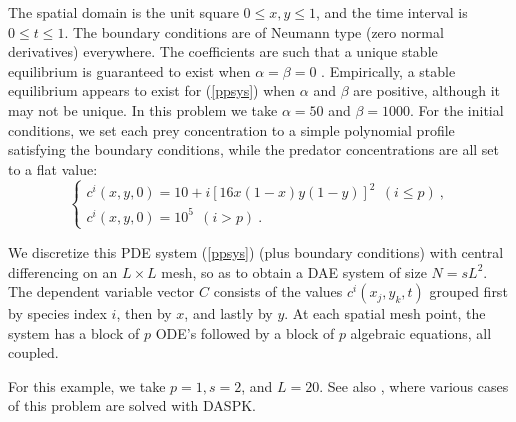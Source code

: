 \documentclass[11pt]{article}
\begin{document}
The spatial domain is the unit square $0 \leq x,y \leq 1$, and the
time interval is $0 \leq t \leq 1$.  The boundary conditions are of
Neumann type (zero normal derivatives) everywhere.  The coefficients
are such that a unique stable equilibrium is guaranteed to exist when
$\alpha = \beta = 0$ \cite{Br86}.  Empirically, a stable equilibrium
appears to exist for (\ref{ppsys}) when $\alpha$ and $\beta$ are
positive, although it may not be unique. In this problem we take
$\alpha = 50$ and $\beta = 1000$.  For the initial conditions, we set
each prey concentration to a simple polynomial profile satisfying the
boundary conditions, while the predator concentrations are all set to
a flat value:
\[
\left\{ \begin{array}{l}
c^i(x,y,0) = 10 + i [16x(1 - x)y(1 - y)]^2 ~~ (i \leq p) ~, \\
c^i(x,y,0) = 10^5 ~~ (i > p) ~.
\end{array} \right.
\]

We discretize this PDE system (\ref{ppsys}) (plus boundary conditions)
with central differencing on an $L \times L$ mesh, so as to obtain a
DAE system of size $N = s L^2$.  The dependent variable vector $C$
consists of the values $c^i(x_j,y_k,t)$ grouped first by species index
$i$, then by $x$, and lastly by $y$.  At each spatial mesh point, the
system has a block of $p$ ODE's followed by a block of $p$ algebraic
equations, all coupled.

For this example, we take $p = 1, s = 2$, and $L = 20$.  See also 
\cite{BrHiPe94}, where various cases of this problem are solved with DASPK.
\end{document}

